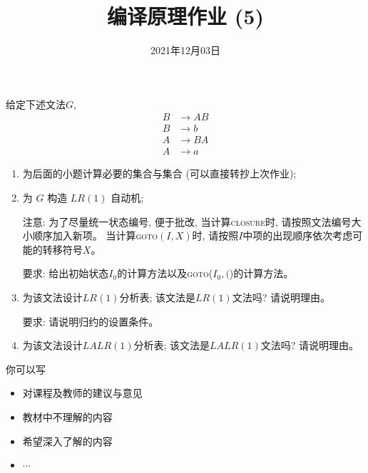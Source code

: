 \documentclass[a4paper, justified]{tufte-handout}
\title{编译原理作业 (5)}
\date{2021年12月03日}
\begin{document}
\maketitle
\noplagiarism %
\begin{abstract}
\end{abstract}
\beginrequired

\begin{problem}[\score{10 = 1 + 4 + 2 + 3}]
  给定下述文法$G$,
  \begin{align}
    B &\to AB \\[8pt]
    B &\to b \\[8pt]
    A &\to BA \\[8pt]
    A &\to a
  \end{align}

  \begin{enumerate}[(1)]
    \item 为后面的小题计算必要的\first{}集合与\follow{}集合 (可以直接转抄上次作业);
    \item 为 $G$ 构造 $LR(1)$ 自动机;

      注意: 为了尽量统一状态编号, 便于批改, 当计算\textsc{closure}时, 请按照文法编号大小顺序加入新项。
      当计算\textsc{goto}$(I, X)$时, 请按照$I$中项的出现顺序依次考虑可能的转移符号$X$。

      要求: 给出初始状态$I_{0}$的计算方法以及\textsc{goto}($I_{0}, ($)的计算方法。
    \item 为该文法设计$LR(1)$分析表; 该文法是$LR(1)$文法吗? 请说明理由。

      要求: 请说明归约的设置条件。
    \item 为该文法设计$LALR(1)$分析表; 该文法是$LALR(1)$文法吗? 请说明理由。
  \end{enumerate}
\end{problem}

\begin{solution}
\end{solution}



\beginfb

你可以写
\begin{itemize}
  \item 对课程及教师的建议与意见
  \item 教材中不理解的内容
  \item 希望深入了解的内容
  \item $\cdots$
\end{itemize}
\end{document}
